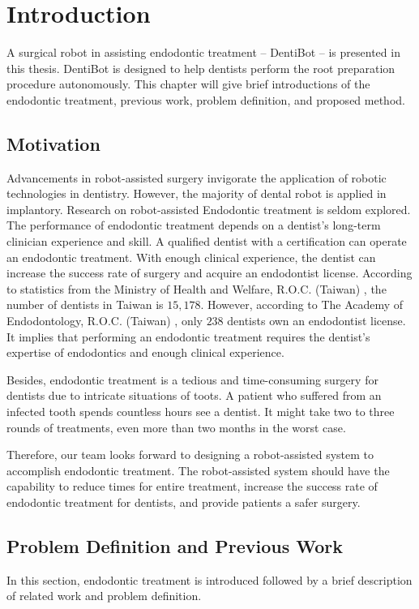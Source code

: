\chapter{Introduction}
\hspace*{6mm}A surgical robot in assisting endodontic treatment -- DentiBot -- is presented in this thesis. DentiBot is designed to help dentists perform the root preparation procedure autonomously. This chapter will give brief introductions of the endodontic treatment, previous work, problem definition, and proposed method.
\section{Motivation}
\hspace*{6mm}Advancements in robot-assisted surgery invigorate the application of robotic technologies in dentistry. However, the majority of dental robot is applied in implantory. Research on robot-assisted Endodontic treatment is seldom explored. The performance of endodontic treatment depends on a dentist's long-term clinician experience and skill. A qualified dentist with a certification can operate an endodontic treatment. With enough clinical experience, the dentist can increase the success rate of surgery and acquire an endodontist license. According to statistics from the Ministry of Health and Welfare, R.O.C. (Taiwan) \cite{web1}, the number of dentists in Taiwan is $15,178$. However, according to The Academy of Endodontology, R.O.C. (Taiwan) \cite{web2}, only $238$ dentists own an endodontist license. It implies that performing an endodontic treatment requires the dentist's expertise of endodontics and enough clinical experience.  
\par
Besides, endodontic treatment is a tedious and time-consuming surgery for dentists due to intricate situations of toots. A patient who suffered from an infected tooth spends countless hours see a dentist. It might take two to three rounds of treatments, even more than two months in the worst case.  
\par
Therefore, our team looks forward to designing a robot-assisted system to accomplish endodontic treatment.  The robot-assisted system should have the capability to reduce times for entire treatment, increase the success rate of endodontic treatment for dentists, and provide patients a safer surgery.
\section{Problem Definition and Previous Work}
\hspace*{6mm}In this section, endodontic treatment is introduced followed by a brief description of related work and problem definition.
